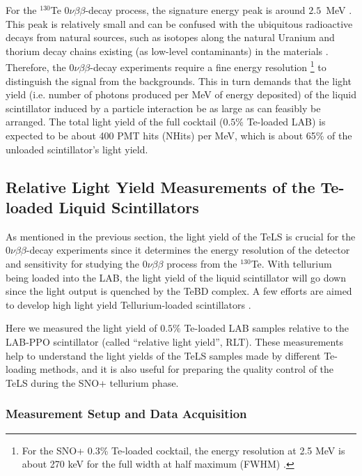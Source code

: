 For the $^{130}${Te} $0\nu\beta\beta$-decay process, the signature energy peak is around $2.5$~MeV \cite{whitepaper}. This peak is relatively small and can be confused with the ubiquitous radioactive decays from natural sources, such as isotopes along the natural Uranium and thorium decay chains existing (as low-level contaminants) in the materials \cite{whitepaper}. Therefore, the $0\nu\beta\beta$-decay experiments require a fine energy resolution \footnote{For the SNO+ 0.3\% Te-loaded cocktail, the energy resolution at 2.5 MeV is about 270 keV for the full width at half maximum (FWHM) \cite{whitepaper}.} to distinguish the signal from the backgrounds. This in turn demands that the light yield (i.e. number of photons produced per MeV of energy deposited) of the liquid scintillator induced by a particle interaction be as large as can feasibly be arranged. The total light yield of the full cocktail ($0.5\%$ Te-loaded LAB) is expected to be about 400 PMT hits (NHits) per MeV, which is about 65\% of the unloaded scintillator's light yield\cite{biller2017new}.

\subsection{Relative Light Yield Measurements of the Te-loaded Liquid Scintillators}\label{sect:RelativeLightYieldMeasurement}

As mentioned in the previous section, the light yield of the TeLS is crucial for the $0\nu\beta\beta$-decay experiments since it determines the energy resolution of the detector and sensitivity for studying the $0\nu\beta\beta$ process from the $^{130}$Te. With tellurium being loaded into the LAB, the light yield of the liquid scintillator will go down since the light output is quenched by the TeBD complex. A few efforts are aimed to develop high light yield Tellurium-loaded scintillators \cite{biller2017new}.

Here we measured the light yield of $0.5\%$ Te-loaded LAB samples relative to the LAB-PPO scintillator (called ``relative light yield'', RLT). These measurements help to understand the light yields of the TeLS samples made by different Te-loading methods, and it is also useful for preparing the quality control of the TeLS during the SNO+ tellurium phase.

\subsubsection{Measurement Setup and Data Acquisition}

